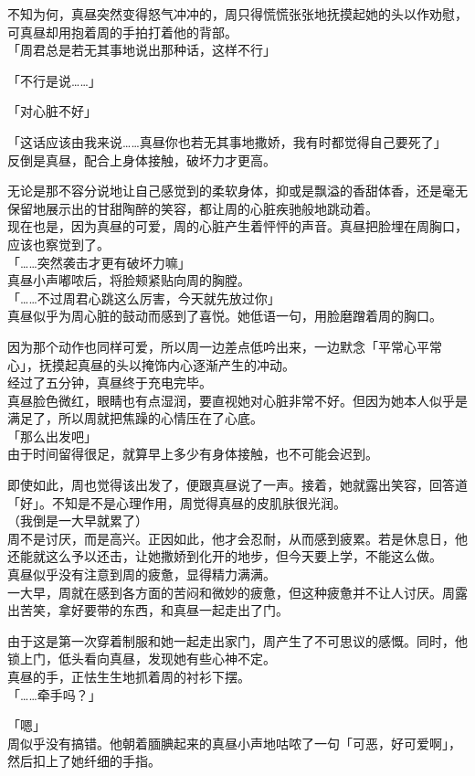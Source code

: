 不知为何，真昼突然变得怒气冲冲的，周只得慌慌张张地抚摸起她的头以作劝慰，可真昼却用抱着周的手拍打着他的背部。\\

「周君总是若无其事地说出那种话，这样不行」

「不行是说……」

「对心脏不好」

「这话应该由我来说……真昼你也若无其事地撒娇，我有时都觉得自己要死了」\\

反倒是真昼，配合上身体接触，破坏力才更高。

无论是那不容分说地让自己感觉到的柔软身体，抑或是飘溢的香甜体香，还是毫无保留地展示出的甘甜陶醉的笑容，都让周的心脏疾驰般地跳动着。\\

现在也是，因为真昼的可爱，周的心脏产生着怦怦的声音。真昼把脸埋在周胸口，应该也察觉到了。\\

「……突然袭击才更有破坏力嘛」\\

真昼小声嘟哝后，将脸颊紧贴向周的胸膛。\\

「……不过周君心跳这么厉害，今天就先放过你」\\

真昼似乎为周心脏的鼓动而感到了喜悦。她低语一句，用脸磨蹭着周的胸口。

因为那个动作也同样可爱，所以周一边差点低吟出来，一边默念「平常心平常心」，抚摸起真昼的头以掩饰内心逐渐产生的冲动。\\

经过了五分钟，真昼终于充电完毕。\\

真昼脸色微红，眼睛也有点湿润，要直视她对心脏非常不好。但因为她本人似乎是满足了，所以周就把焦躁的心情压在了心底。\\

「那么出发吧」\\

由于时间留得很足，就算早上多少有身体接触，也不可能会迟到。

即使如此，周也觉得该出发了，便跟真昼说了一声。接着，她就露出笑容，回答道「好」。不知是不是心理作用，周觉得真昼的皮肌肤很光润。\\

（我倒是一大早就累了）\\

周不是讨厌，而是高兴。正因如此，他才会忍耐，从而感到疲累。若是休息日，他还能就这么予以还击，让她撒娇到化开的地步，但今天要上学，不能这么做。\\

真昼似乎没有注意到周的疲惫，显得精力满满。\\

一大早，周就在感到各方面的苦闷和微妙的疲惫，但这种疲惫并不让人讨厌。周露出苦笑，拿好要带的东西，和真昼一起走出了门。

由于这是第一次穿着制服和她一起走出家门，周产生了不可思议的感慨。同时，他锁上门，低头看向真昼，发现她有些心神不定。\\

真昼的手，正怯生生地抓着周的衬衫下摆。\\

「……牵手吗？」

「嗯」\\

周似乎没有搞错。他朝着腼腆起来的真昼小声地咕哝了一句「可恶，好可爱啊」，然后扣上了她纤细的手指。
